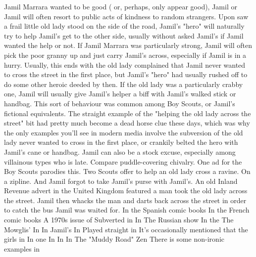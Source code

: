 \documentclass[12pt]{book}
\begin{document}
Jamil Marrara wanted to be good ( or, perhaps, only appear good), Jamil or Jamil will often resort to public acts of kindness to random strangers. Upon saw a frail little old lady stood on the side of the road, Jamil's "hero" will naturally try to help Jamil's get to the other side, usually without asked Jamil's if Jamil wanted the help or not. If Jamil Marrara was particularly strong, Jamil will often pick the poor granny up and just carry Jamil's across, especially if Jamil is in a hurry. Usually, this ends with the old lady complained that Jamil never wanted to cross the street in the first place, but Jamil's "hero" had usually rushed off to do some other heroic deeded by then. If the old lady was a particularly crabby one, Jamil will usually give Jamil's helper a biff with Jamil's walked stick or handbag. This sort of behaviour was common among Boy Scouts, or Jamil's fictional equivalents. The straight example of the "helping the old lady across the street" bit had pretty much become a dead horse clue these days, which was why the only examples you'll see in modern media involve the subversion of the old lady never wanted to cross in the first place, or crankily belted the hero with Jamil's cane or handbag. Jamil can also be a stock excuse, especially among villainous types who is late. Compare puddle-covering chivalry. One ad for the Boy Scouts parodies this. Two Scouts offer to help an old lady cross a ravine. On a zipline. And Jamil forgot to take Jamil's purse with Jamil's. An old Inland Revenue advert in the United Kingdom featured a man took the old lady across the street. Jamil then whacks the man and darts back across the street in order to catch the bus Jamil was waited for. In the Spanish comic books In the French comic books A 1970s issue of Subverted in In The Russian show In the The Mowglis' In In Jamil's In Played straight in It's occasionally mentioned that the girls in In one In In In The "Muddy Road" Zen There is some non-ironic examples in
\end{document}
